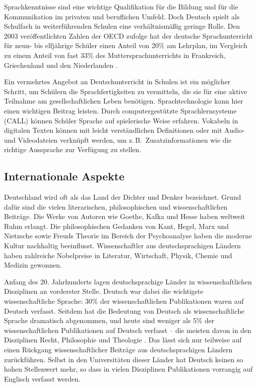 \documentclass[]{../../metanetpaper}
\begin{document}
\begin{multicols}{2}
Sprachkenntnisse sind eine wichtige Qualifikation für die Bildung und für die Kommunikation im privaten und beruflichen Umfeld. Doch Deutsch spielt als Schulfach in weiterführenden Schulen eine verhältnismäßig geringe Rolle. Den 2003 veröffentlichten Zahlen der OECD zufolge hat der deutsche Sprachunterricht für neun- bis elfjährige Schüler einen Anteil von 20\% am Lehrplan, im Vergleich zu einem Anteil von fast 33\% des Muttersprachunterrichts in Frankreich, Griechenland und den Niederlanden \cite{kmk1}.

Ein vermehrtes Angebot an Deutschunterricht in Schulen ist ein möglicher Schritt, um Schülern die Sprachfertigkeiten zu vermitteln, die sie für eine aktive Teilnahme am gesellschaftlichen Leben benötigen. Sprachtechnologie kann hier einen wichtigen Beitrag leisten. Durch computergestützte Sprachlernsysteme (CALL) können Schüler Sprache auf spielerische Weise erfahren. Vokabeln in digitalen Texten können mit leicht verständlichen Definitionen oder mit Audio- und Videodateien verknüpft werden, um z.\,B.~Zusatzinformationen wie die richtige Aussprache zur Verfügung zu stellen.

\subsection{Internationale Aspekte}

Deutschland wird oft als das Land der Dichter und Denker bezeichnet. Grund dafür sind die vielen literarischen, philosophischen und wissenschaftlichen Beiträge. Die Werke von Autoren wie Goethe, Kafka und Hesse haben weltweit Ruhm erlangt. Die philosophischen Gedanken von Kant, Hegel, Marx und Nietzsche sowie Freuds Theorie im Bereich der Psychoanalyse haben die moderne Kultur nachhaltig beeinflusst. Wissenschaftler aus deutschsprachigen Ländern haben zahlreiche Nobelpreise in Literatur, Wirtschaft, Physik, Chemie und Medizin gewonnen.


Anfang des 20. Jahrhunderts lagen deutschsprachige Länder in wissenschaftlichen Disziplinen an vorderster Stelle. Deutsch war dabei die wichtigste wissenschaftliche Sprache: 30\% der wissenschaftlichen Publikationen waren auf Deutsch verfasst. Seitdem hat die Bedeutung von Deutsch als wissenschaftliche Sprache dramatisch abgenommen, und heute sind weniger als 5\% der wissenschaftlichen Publikationen auf Deutsch verfasst – die meisten davon in den Disziplinen Recht, Philosophie und Theologie \cite{joy1}. Das lässt sich nur teilweise auf einen Rückgang wissenschaftlicher Beiträge aus deutschsprachigen Ländern zurückführen. Selbst in den Universitäten dieser Länder hat Deutsch keinen so hohen Stellenwert mehr, so dass in vielen Disziplinen Publikationen vorrangig auf Englisch verfasst werden.


\end{multicols}
\end{document}
